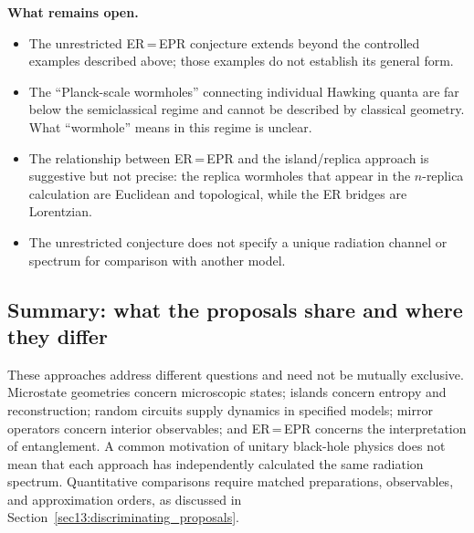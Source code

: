 \documentclass[11pt,letterpaper]{article}
\theoremstyle{plain}
\theoremstyle{definition}
\theoremstyle{remark}
\begin{document}
\medskip
\noindent
\textbf{What remains open.}
\begin{itemize}
  \item The unrestricted ER\,=\,EPR conjecture extends beyond the controlled
    examples described above; those examples do not establish its general form.
  \item The ``Planck-scale wormholes'' connecting individual Hawking quanta
    are far below the semiclassical regime and cannot be described by
    classical geometry.  What ``wormhole'' means in this regime is unclear.
  \item The relationship between ER\,=\,EPR and the island/replica
    approach is suggestive but not precise: the replica wormholes that
    appear in the $n$-replica calculation are Euclidean and topological,
    while the ER bridges are Lorentzian.
  \item The unrestricted conjecture does not specify a unique radiation
    channel or spectrum for comparison with another model.
\end{itemize}

\subsection{Summary: what the proposals share and where they differ}

These approaches address different questions and need not be mutually
exclusive.  Microstate geometries concern microscopic states; islands concern
entropy and reconstruction; random circuits supply dynamics in specified
models; mirror operators concern interior observables; and ER\,=\,EPR concerns
the interpretation of entanglement.  A common motivation of unitary black-hole
physics does not mean that each approach has independently calculated the same
radiation spectrum.  Quantitative comparisons require matched preparations,
observables, and approximation orders, as discussed in
Section~\ref{sec13:discriminating_proposals}.
\end{document}
